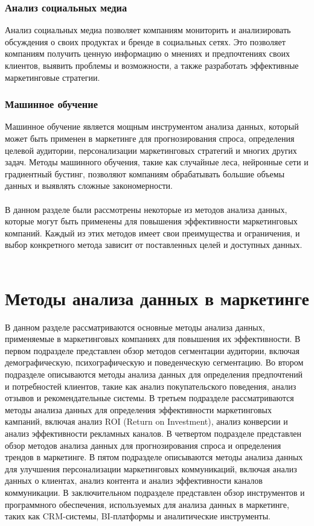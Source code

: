 \documentclass{article}
\begin{document}
\subsubsection{Анализ социальных медиа}
Анализ социальных медиа позволяет компаниям мониторить и анализировать обсуждения о своих продуктах и бренде в социальных сетях. Это позволяет компаниям получить ценную информацию о мнениях и предпочтениях своих клиентов, выявить проблемы и возможности, а также разработать эффективные маркетинговые стратегии.
\subsubsection{Машинное обучение}
Машинное обучение является мощным инструментом анализа данных, который может быть применен в маркетинге для прогнозирования спроса, определения целевой аудитории, персонализации маркетинговых стратегий и многих других задач. Методы машинного обучения, такие как случайные леса, нейронные сети и градиентный бустинг, позволяют компаниям обрабатывать большие объемы данных и выявлять сложные закономерности.\\
~\\
В данном разделе были рассмотрены некоторые из методов анализа данных, которые могут быть применены для повышения эффективности маркетинговых компаний. Каждый из этих методов имеет свои преимущества и ограничения, и выбор конкретного метода зависит от поставленных целей и доступных данных.\\
~\\

\newpage
\section{Методы анализа данных в маркетинге}
В данном разделе рассматриваются основные методы анализа данных, применяемые в маркетинговых компаниях для повышения их эффективности. В первом подразделе представлен обзор методов сегментации аудитории, включая демографическую, психографическую и поведенческую сегментацию. Во втором подразделе описываются методы анализа данных для определения предпочтений и потребностей клиентов, такие как анализ покупательского поведения, анализ отзывов и рекомендательные системы. В третьем подразделе рассматриваются методы анализа данных для определения эффективности маркетинговых кампаний, включая анализ ROI (Return on Investment), анализ конверсии и анализ эффективности рекламных каналов. В четвертом подразделе представлен обзор методов анализа данных для прогнозирования спроса и определения трендов в маркетинге. В пятом подразделе описываются методы анализа данных для улучшения персонализации маркетинговых коммуникаций, включая анализ данных о клиентах, анализ контента и анализ эффективности каналов коммуникации. В заключительном подразделе представлен обзор инструментов и программного обеспечения, используемых для анализа данных в маркетинге, таких как CRM-системы, BI-платформы и аналитические инструменты.
\end{document}
